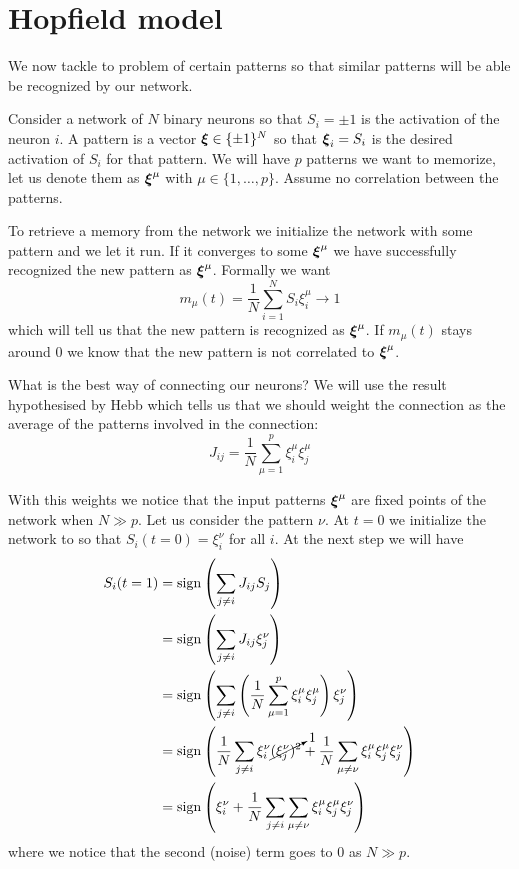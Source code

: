 \documentclass[12pt]{extarticle}
\renewcommand{\vec}[1]{\bvec{#1}}
\begin{document}
\section{Hopfield model}

We now tackle to problem of  certain patterns so that similar patterns will be able
be recognized by our network.

Consider a network of $N$ binary neurons so that $S_i = \pm 1$ is the activation of the neuron $i$.
A pattern is a vector $\vec \xi \in \{\pm 1\}^N$ so that $\vec \xi_i = S_i$ is the desired
activation of $S_i$ for that pattern. We will have $p$ patterns we want to memorize, let us denote
them as $\vec \xi^\mu$ with $\mu \in \{1, \dots, p\}$.
Assume no correlation between the patterns.

To retrieve a memory from the network we initialize the network with some pattern and we let it run.
If it converges to some $\vec \xi^\mu$ we have successfully recognized the new pattern as
$\vec \xi^\mu$. Formally we want
\begin{equation}
	m_\mu(t) = \frac{1}{N} \sum_{i = 1}^N S_i \xi^\mu_i \to 1
\end{equation}
which will tell us that the new pattern is recognized as $\vec \xi^\mu$. If $m_\mu(t)$ stays around
$0$ we know that the new pattern is not correlated to $\vec \xi^\mu$.

What is the best way of connecting our neurons? We will use the result hypothesised by Hebb which
tells us that we should weight the connection as the average of the patterns involved in the
connection:
\begin{equation}
	J_{ij} = \frac{1}{N} \sum_{\mu = 1}^p \xi_i^\mu \xi_j^\mu
\end{equation}

With this weights we notice that the input patterns $\vec \xi^\mu$ are fixed points of the network
when $N \gg p$.
Let us consider the pattern $\nu$.
At $t = 0$ we initialize the network to so that $S_i(t=0) = \xi^\nu_i$ for all $i$.
At the next step we will have
\begin{align}
	S_i(t=1) & = \mathrm{sign}\left( \sum_{j \neq i} J_{ij} S_j \right)                                                                                                        \\
	         & = \mathrm{sign}\left( \sum_{j \neq i} J_{ij} \xi^\nu_j \right)                                                                                                  \\
	         & = \mathrm{sign}\left( \sum_{j \neq i} \left(\frac{1}{N} \sum_{\mu = 1}^p \xi_i^\mu \xi_j^\mu\right) \xi^\nu_j \right)                                           \\
	         & = \mathrm{sign}\left( \frac{1}{N} \sum_{j \neq i} \xi^\nu_i \cancelto{1}{(\xi^\nu_j)^2} + \frac{1}{N} \sum_{\mu \neq \nu} \xi_i^\mu \xi_j^\mu \xi^\nu_j \right) \\
	         & = \mathrm{sign}\left( \xi^\nu_i + \frac{1}{N} \sum_{j \neq i} \sum_{\mu \neq \nu} \xi_i^\mu \xi_j^\mu \xi^\nu_j \right)
\end{align}
where we notice that the second (noise) term goes to $0$ as $N \gg p$.
\end{document}
